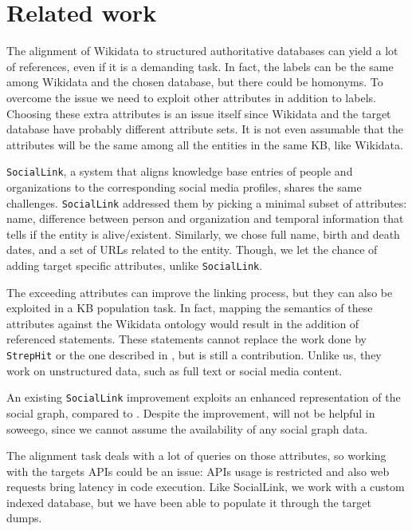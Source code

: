 \chapter{Related work}
\label{cha:2}
The alignment of Wikidata to structured authoritative databases can yield a lot of references, even if it is a demanding task. In fact, the labels can be the same among Wikidata and the chosen database, but there could be homonyms. To overcome the issue we need to exploit other attributes in addition to labels. Choosing these extra attributes is an issue itself since Wikidata and the target database have probably different attribute sets. It is not even assumable that the attributes will be the same among all the entities in the same KB, like Wikidata. 

\texttt{SocialLink}, a system that aligns knowledge base entries of people and organizations to the  corresponding social media profiles\cite{DBLP:conf/semweb/NechaevCG17a}, shares the same challenges. \texttt{SocialLink} addressed them by picking a minimal subset of attributes: name, difference between person and organization and temporal information that tells if the entity is alive/existent. Similarly, we chose full name, birth and death dates, and a set of URLs related to the entity. Though, we let the chance of adding target specific attributes, unlike \texttt{SocialLink}.

The exceeding attributes can improve the linking process, but they can also be exploited in a KB population task. In fact, mapping the semantics of these attributes against the Wikidata ontology would result in the addition of referenced statements. These statements cannot replace the work done by \texttt{StrepHit}\cite{DBLP:journals/semweb/FossatiDG18} or the one described in \cite{self:SocialLink/TypePrediction}, but is still a contribution. Unlike us, they work on unstructured data, such as full text or social media content.

An existing \texttt{SocialLink} improvement \cite{self:SocialLink/Embeddings} exploits an enhanced representation of the social graph, compared to \cite{DBLP:conf/sac/NechaevCG17}. Despite the improvement, \cite{self:SocialLink/Embeddings} will not be helpful in soweego, since we cannot assume the availability of any social graph data.

The alignment task deals with a lot of queries on those attributes, so working with the targets APIs could be an issue: APIs usage is restricted and also web requests bring latency in code execution. Like SocialLink\cite{DBLP:conf/sac/NechaevCG17}, we work with a custom indexed database, but we have been able to populate it through the target dumps.

